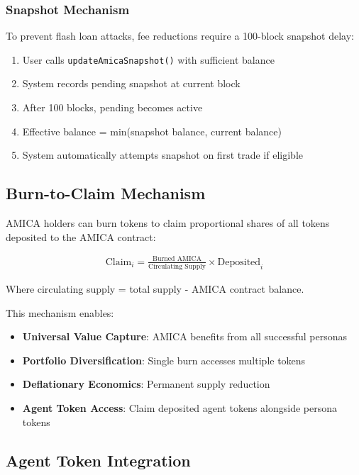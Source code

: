 \documentclass{article}
\begin{document}
\subsubsection{Snapshot Mechanism}

To prevent flash loan attacks, fee reductions require a 100-block snapshot delay:

\begin{enumerate}
    \item User calls \texttt{updateAmicaSnapshot()} with sufficient balance
    \item System records pending snapshot at current block
    \item After 100 blocks, pending becomes active
    \item Effective balance = min(snapshot balance, current balance)
    \item System automatically attempts snapshot on first trade if eligible
\end{enumerate}

\subsection{Burn-to-Claim Mechanism}

AMICA holders can burn tokens to claim proportional shares of all tokens deposited to the AMICA contract:

\begin{align}
\text{Claim}_i = \frac{\text{Burned AMICA}}{\text{Circulating Supply}} \times \text{Deposited}_i
\end{align}

Where circulating supply = total supply - AMICA contract balance.

This mechanism enables:
\begin{itemize}
    \item \textbf{Universal Value Capture}: AMICA benefits from all successful personas
    \item \textbf{Portfolio Diversification}: Single burn accesses multiple tokens
    \item \textbf{Deflationary Economics}: Permanent supply reduction
    \item \textbf{Agent Token Access}: Claim deposited agent tokens alongside persona tokens
\end{itemize}

\subsection{Agent Token Integration}
\end{document}
